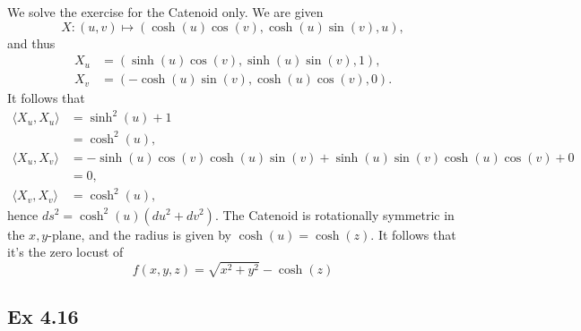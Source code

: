 \documentclass{article}
\theoremstyle{definition}
\begin{document}
We solve the exercise for the Catenoid only. We are given 
\[
	X : (u, v)
	\mapsto
	(\cosh(u) \cos(v), \cosh(u) \sin(v), u),
\]
and thus
\begin{align*}
	X_u
	&=
	(\sinh(u)\cos(v), \sinh(u)\sin(v), 1), \\
	X_v
	&=
	(-\cosh(u) \sin(v), \cosh(u) \cos(v), 0).
\end{align*} 
It follows that 
\begin{align*}
	\langle X_u, X_u \rangle
	&=
	\sinh^2(u) + 1 \\
	&=
	\cosh^2(u), \\
	\langle X_u, X_v \rangle
	&=
	-\sinh(u)\cos(v)\cosh(u)\sin(v)
	+
	\sinh(u)\sin(v)\cosh(u)\cos(v)
	+
	0 \\
	&=
	0, \\
	\langle X_v, X_v \rangle
	&=
	\cosh^2(u),
\end{align*}
hence $ds^2 = \cosh^2(u)(du^2 + dv^2)$. The Catenoid is rotationally symmetric in 
the $x,y$-plane, and the radius is given by $\cosh(u) = \cosh(z)$. It follows 
that it's the zero locust of 
\[
	f(x, y, z)
	=
	\sqrt{x^2 + y^2} - \cosh(z)
\] 

\subsection*{Ex 4.16}
\end{document}
